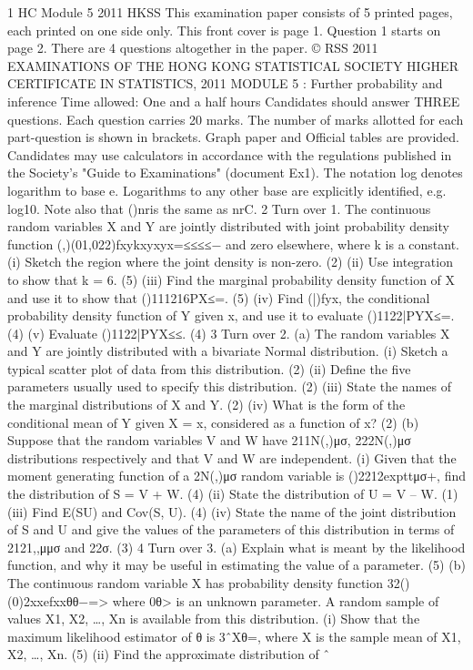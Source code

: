 1 HC Module 5 2011 HKSS
This examination paper consists of 5 printed pages, each printed on one side only.
This front cover is page 1.
Question 1 starts on page 2.
There are 4 questions altogether in the paper.
© RSS 2011
EXAMINATIONS OF THE HONG KONG STATISTICAL SOCIETY HIGHER CERTIFICATE IN STATISTICS, 2011 MODULE 5 : Further probability and inference Time allowed: One and a half hours Candidates should answer THREE questions. Each question carries 20 marks. The number of marks allotted for each part-question is shown in brackets. Graph paper and Official tables are provided. Candidates may use calculators in accordance with the regulations published in the Society's "Guide to Examinations" (document Ex1). The notation log denotes logarithm to base e. Logarithms to any other base are explicitly identified, e.g. log10. Note also that ()nris the same as nrC.
2
Turn over
1. The continuous random variables X and Y are jointly distributed with joint probability density function (,)(01,022)fxykxyxyx=≤≤≤≤− and zero elsewhere, where k is a constant. (i) Sketch the region where the joint density is non-zero. (2) (ii) Use integration to show that k = 6. (5) (iii) Find the marginal probability density function of X and use it to show that ()111216PX≤=. (5) (iv) Find (|)fyx, the conditional probability density function of Y given x, and use it to evaluate ()1122|PYX≤=. (4) (v) Evaluate ()1122|PYX≤≤. (4)
3
Turn over
2. (a) The random variables X and Y are jointly distributed with a bivariate Normal distribution. (i) Sketch a typical scatter plot of data from this distribution. (2) (ii) Define the five parameters usually used to specify this distribution. (2) (iii) State the names of the marginal distributions of X and Y. (2) (iv) What is the form of the conditional mean of Y given X = x, considered as a function of x? (2) (b) Suppose that the random variables V and W have 211N(,)μσ, 222N(,)μσ distributions respectively and that V and W are independent. (i) Given that the moment generating function of a 2N(,)μσ random variable is ()2212expttμσ+, find the distribution of S = V + W. (4) (ii) State the distribution of U = V – W. (1) (iii) Find E(SU) and Cov(S, U). (4) (iv) State the name of the joint distribution of S and U and give the values of the parameters of this distribution in terms of 2121,,μμσ and 22σ. (3)
4
Turn over
3. (a) Explain what is meant by the likelihood function, and why it may be useful in estimating the value of a parameter. (5) (b) The continuous random variable X has probability density function 32()(0)2xxefxxθθ−=> where 0θ> is an unknown parameter. A random sample of values X1, X2, …, Xn is available from this distribution. (i) Show that the maximum likelihood estimator of θ is 3ˆXθ=, where X is the sample mean of X1, X2, …, Xn. (5) (ii) Find the approximate distribution of ˆ
